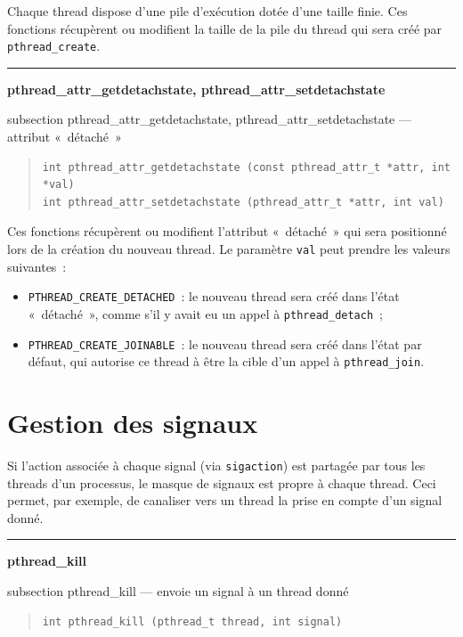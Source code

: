 \documentclass [twoside] {report}
\newcommand {\primitive} [1]
    {
	\phantomsection
	{\large \textbf {#1}}
	\addcontentsline {toc} {subsection} {#1}
    }
\newcommand {\separation}
    {
	\vspace {5mm}
	\nopagebreak
	\hrule
    }
\begin{document}
Chaque thread dispose d'une pile d'exécution dotée d'une taille
finie. Ces fonctions récupèrent ou modifient la taille de la pile
du thread qui sera créé par \verb|pthread_create|.


\separation
\primitive {pthread\_attr\_getdetachstate,
pthread\_attr\_setdetachstate} --- attribut «~détaché~»

\begin {quote}
\begin {verbatim}
int pthread_attr_getdetachstate (const pthread_attr_t *attr, int *val)
int pthread_attr_setdetachstate (pthread_attr_t *attr, int val)
\end{verbatim}
\end {quote}

Ces fonctions récupèrent ou modifient l'attribut «~détaché~» qui
sera positionné lors de la création du nouveau thread. Le paramètre
\texttt {val} peut prendre les valeurs suivantes~:

\begin {itemize}
    \item \verb|PTHREAD_CREATE_DETACHED|~: le nouveau thread sera
	créé dans l'état «~détaché~», comme s'il y avait eu un appel
	à \verb|pthread_detach|~;
    \item \verb|PTHREAD_CREATE_JOINABLE|~: le nouveau thread sera
	créé dans l'état par défaut, qui autorise ce thread à être
	la cible d'un appel à \verb|pthread_join|.
\end {itemize}


\section {Gestion des signaux}

Si l'action associée à chaque signal (via \texttt {sigaction}) est
partagée par tous les threads d'un processus, le masque de signaux est
propre à chaque thread. Ceci permet, par exemple, de canaliser vers un
thread la prise en compte d'un signal donné.


\separation 
\primitive {pthread\_kill} --- envoie un signal à un thread donné

\begin {quote}
\begin {verbatim}
int pthread_kill (pthread_t thread, int signal)
\end{verbatim}
\end {quote}
\end{document}
